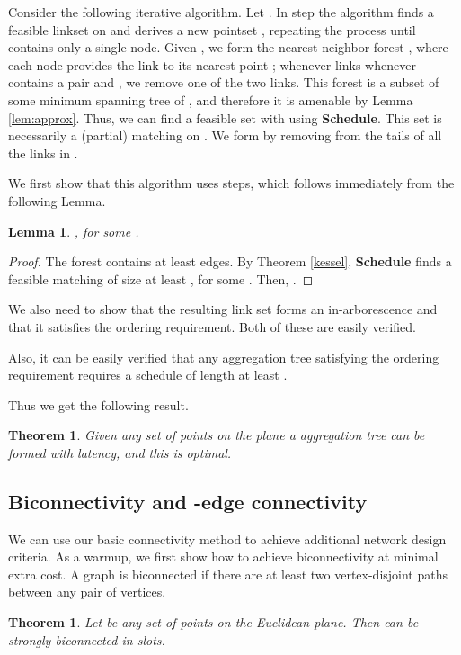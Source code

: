\documentclass[11pt]{amsart}
\newcounter{foo}
\newtheorem{theorem}[foo]{Theorem}
\newtheorem{lemma}[foo]{Lemma}
\begin{document}
Consider the following iterative algorithm. 
Let .
In step  the algorithm finds a feasible linkset  on  and derives a new pointset , repeating the process until  contains only a single node.
Given , we form the nearest-neighbor forest , where each node  provides the link  to its nearest point ; whenever links
whenever  contains a pair  and , we remove one of the two links. This forest  is a subset of some minimum spanning tree of , and therefore it is amenable by Lemma \ref{lem:approx}. 
Thus, we can find a feasible set  with 
using \textbf{Schedule}.
This set  is necessarily a (partial) matching on .
We form  by removing from  the tails of all the links in .

We first show that this algorithm uses  steps, which follows immediately from the following Lemma.

\begin{lemma}
, for some .
\end{lemma}
\begin{proof}
The forest  contains at least  edges.
By Theorem \ref{kessel}, \textbf{Schedule} finds a feasible matching  of size at least , for some .
Then, .
\end{proof}

We also need to show that the resulting link set forms an in-arborescence and that it satisfies the ordering requirement.
Both of these are easily verified.


Also, it can be easily verified that any aggregation tree satisfying the ordering requirement requires a schedule of length at least . 


Thus we get the following result.
\begin{theorem}
Given any set of  points on the plane a aggregation tree can be formed with  latency, and this is optimal.
\end{theorem}



\subsection{Biconnectivity and -edge connectivity}

We can use our basic connectivity method to achieve additional network
design criteria. 
As a warmup, we first show how to achieve biconnectivity at minimal extra cost.
A graph is biconnected if there are at least two vertex-disjoint paths between
any pair of vertices.
\begin{theorem}
Let  be any set of points on the Euclidean plane. Then  can be
strongly biconnected in  slots.
\label{mainth3}
\end{theorem}
\end{document}
